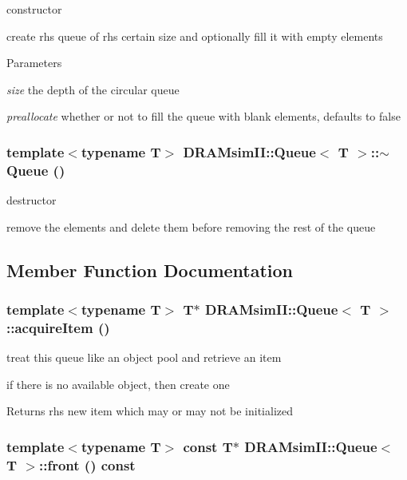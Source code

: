 constructor 

create rhs queue of rhs certain size and optionally fill it with empty elements 
\begin{DoxyParams}{Parameters}
\item[{\em size}]the depth of the circular queue \item[{\em preallocate}]whether or not to fill the queue with blank elements, defaults to false \end{DoxyParams}
\subsubsection[{$\sim$Queue}]{\setlength{\rightskip}{0pt plus 5cm}template$<$typename T$>$ {\bf DRAMsimII::Queue}$<$ T $>$::$\sim${\bf Queue} ()\hspace{0.3cm}{\ttfamily  [inline]}}\label{class_d_r_a_msim_i_i_1_1_queue_a3b3f6d860c9b966677b4e1a195e777bf}


destructor 

remove the elements and delete them before removing the rest of the queue 

\subsection{Member Function Documentation}
\subsubsection[{acquireItem}]{\setlength{\rightskip}{0pt plus 5cm}template$<$typename T$>$ T$\ast$ {\bf DRAMsimII::Queue}$<$ T $>$::acquireItem ()\hspace{0.3cm}{\ttfamily  [inline]}}\label{class_d_r_a_msim_i_i_1_1_queue_ab54786763992c459ad787749a01ba545}


treat this queue like an object pool and retrieve an item 

if there is no available object, then create one \begin{DoxyReturn}{Returns}
rhs new item which may or may not be initialized 
\end{DoxyReturn}
\subsubsection[{front}]{\setlength{\rightskip}{0pt plus 5cm}template$<$typename T$>$ const T$\ast$ {\bf DRAMsimII::Queue}$<$ T $>$::front () const\hspace{0.3cm}{\ttfamily  [inline]}}\label{class_d_r_a_msim_i_i_1_1_queue_a850213fe5d31d3b2f6edc194d6e72b3d}


